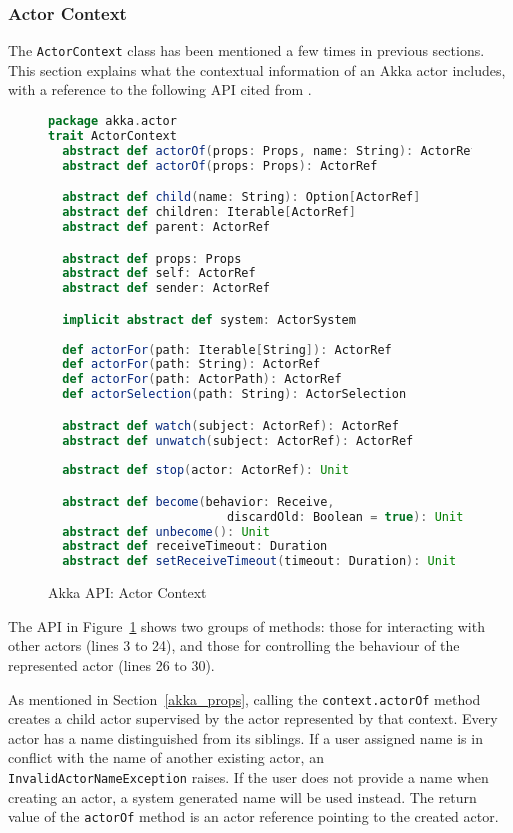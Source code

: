 \subsubsection{Actor Context}
\label{akka_actor_context}

The {\tt ActorContext} class has been mentioned a few times in previous 
sections.  This section explains what the contextual information of an Akka 
actor includes, with a reference to the following API cited from 
\citep{akka_api}.


\begin{figure}[h]
\begin{lstlisting}[language=scala]
package akka.actor
trait ActorContext
  abstract def actorOf(props: Props, name: String): ActorRef
  abstract def actorOf(props: Props): ActorRef

  abstract def child(name: String): Option[ActorRef]
  abstract def children: Iterable[ActorRef]
  abstract def parent: ActorRef

  abstract def props: Props
  abstract def self: ActorRef
  abstract def sender: ActorRef

  implicit abstract def system: ActorSystem
  
  def actorFor(path: Iterable[String]): ActorRef
  def actorFor(path: String): ActorRef
  def actorFor(path: ActorPath): ActorRef
  def actorSelection(path: String): ActorSelection 

  abstract def watch(subject: ActorRef): ActorRef
  abstract def unwatch(subject: ActorRef): ActorRef
      
  abstract def stop(actor: ActorRef): Unit

  abstract def become(behavior: Receive, 
                         discardOld: Boolean = true): Unit
  abstract def unbecome(): Unit
  abstract def receiveTimeout: Duration
  abstract def setReceiveTimeout(timeout: Duration): Unit 
\end{lstlisting}
\caption{Akka API: Actor Context}
\label{akka_actor_context_api}
\end{figure}

The API in Figure~\ref{akka_actor_context_api} shows two groups of methods: 
those for interacting with other actors (lines 3 to 24), and those for 
controlling the behaviour of the represented actor (lines 26 to 30).  

As mentioned in Section~\ref{akka_props}, calling the {\tt context.actorOf} 
method creates a child actor supervised by the actor represented by that 
context.  Every actor has a name distinguished from its siblings.  If a user 
assigned name is in conflict with the name of another existing actor, an {\tt 
InvalidActorNameException} raises. If the user does not provide a name when 
creating an actor, a system generated name will be used instead. The return 
value of the {\tt actorOf} method is an actor reference pointing to the created 
actor.

